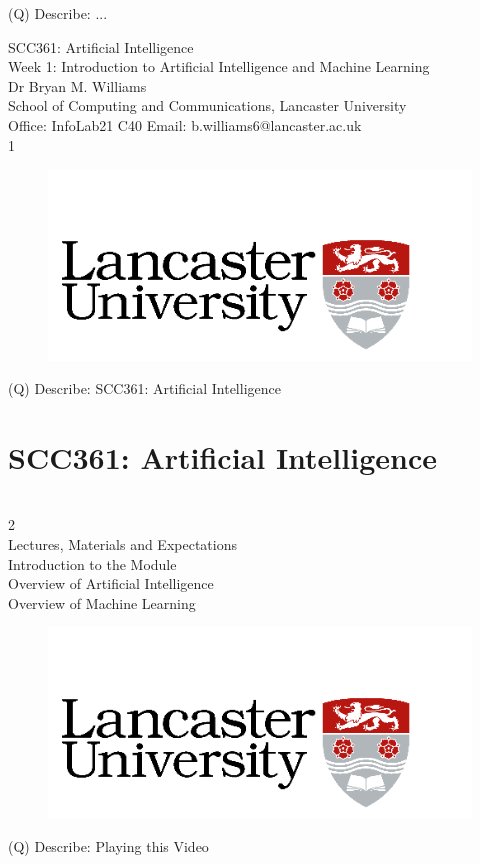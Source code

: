 \documentclass[12pt]{article}
\begin{document}
(Q)
Describe: ...
\clearpage

SCC361: Artificial Intelligence\\
Week 1: Introduction to Artificial Intelligence and Machine Learning\\
Dr Bryan M. Williams\\
School of Computing and Communications, Lancaster University\\
Office: InfoLab21 C40 Email: b.williams6@lancaster.ac.uk\\
1\\
\begin{figure}[H]
\includegraphics[width=0.5\linewidth]{page1-image-1.png}
\end{figure}
\clearpage
(Q)
Describe: SCC361: Artificial Intelligence
\clearpage
\section{SCC361: Artificial Intelligence}
\\
2\\
Lectures, Materials and Expectations\\
Introduction to the Module\\
Overview of Artificial Intelligence\\
Overview of Machine Learning\\
\begin{figure}[H]
\includegraphics[width=0.5\linewidth]{page1-image-1.png}
\end{figure}
\clearpage
(Q)
Describe: Playing this Video
\clearpage
\end{document}

